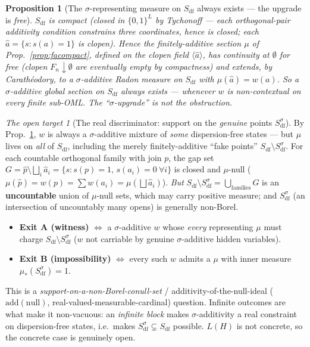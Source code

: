 \documentclass[11pt]{article}
\newtheorem{proposition}[theorem]{Proposition}
\theoremstyle{definition}
\theoremstyle{remark}
\newtheorem*{target}{The open target}
\newcommand{\df}{\mathrm{df}}            %
\begin{document}
\begin{proposition}[The $\sigma$-representing measure on $S_{\df}$ always exists --- the upgrade is \emph{free}]\label{prop:sdfcompact}
$S_{\df}$ is \emph{compact} (closed in $\{0,1\}^{L}$ by Tychonoff --- each
orthogonal-pair additivity condition constrains three coordinates, hence is closed;
each $\hat a=\{s:s(a)=1\}$ is clopen). Hence the finitely-additive section
$\mu$ of Prop.~\ref{prop:facompact}, defined on the clopen field $\langle\hat a\rangle$,
has continuity at $\emptyset$ for free (clopen $F_n\downarrow\emptyset$ are eventually
empty by compactness) and extends, by Carath\'eodory, to a $\sigma$-additive Radon
measure on $S_{\df}$ with $\mu(\hat a)=w(a)$. \emph{So a $\sigma$-additive global
section on $S_{\df}$ always exists --- whenever $w$ is non-contextual on every finite
sub-OML.} The ``$\sigma$-upgrade'' is \emph{not} the obstruction.
\end{proposition}

\begin{mdframed}[backgroundcolor=black!5,linewidth=0.8pt]
\begin{target}[The real discriminator: support on the \emph{genuine} points $S_{\df}^{\sigma}$]\label{tgt:upgrade}
By Prop.~\ref{prop:sdfcompact}, $w$ is always a $\sigma$-additive mixture of
\emph{some} dispersion-free states --- but $\mu$ lives on \emph{all} of $S_{\df}$,
including the merely finitely-additive ``fake points''
$S_{\df}\setminus S_{\df}^{\sigma}$. For each countable orthogonal family with join
$p$, the gap set $G=\hat p\setminus\bigsqcup_i\hat a_i=\{s:s(p)=1,\,s(a_i)=0\ \forall
i\}$ is closed and $\mu$-null ($\mu(\hat p)=w(p)=\sum w(a_i)=\mu(\bigsqcup\hat a_i)$).
\emph{But} $S_{\df}\setminus S_{\df}^{\sigma}=\bigcup_{\text{families}}G$ is an
\textbf{uncountable} union of $\mu$-null sets, which may carry positive measure; and
$S_{\df}^{\sigma}$ (an intersection of uncountably many opens) is generally non-Borel.
\begin{itemize}[nosep]
  \item \textbf{Exit A (witness)} $\Leftrightarrow$ a $\sigma$-additive $w$ whose
    \emph{every} representing $\mu$ must charge $S_{\df}\setminus S_{\df}^{\sigma}$
    ($w$ not carriable by genuine $\sigma$-additive hidden variables).
  \item \textbf{Exit B (impossibility)} $\Leftrightarrow$ every such $w$ admits a
    $\mu$ with inner measure $\mu_{*}(S_{\df}^{\sigma})=1$.
\end{itemize}
This is a \emph{support-on-a-non-Borel-conull-set} / additivity-of-the-null-ideal
($\mathrm{add}(\mathrm{null})$, real-valued-measurable-cardinal) question. Infinite
outcomes are what make it non-vacuous: an \emph{infinite block} makes
$\sigma$-additivity a real constraint on dispersion-free states, i.e.\ makes
$S_{\df}^{\sigma}\subsetneq S_{\df}$ possible. $L(H)$ is not concrete, so the concrete
case is genuinely open.
\end{target}
\end{mdframed}
\end{document}
